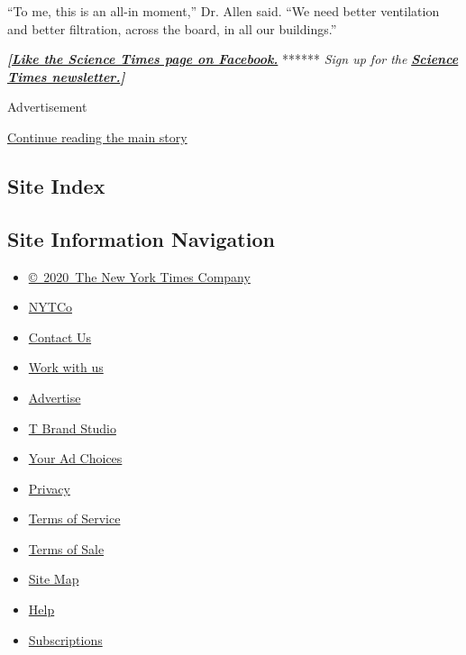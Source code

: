 ``To me, this is an all-in moment,'' Dr. Allen said. ``We need better
ventilation and better filtration, across the board, in all our
buildings.''

\textbf{\emph{{[}}\href{http://on.fb.me/1paTQ1h}{\emph{Like the Science
Times page on Facebook.}}} ****** \emph{\textbar{} Sign up for the}
\textbf{\href{http://nyti.ms/1MbHaRU}{\emph{Science Times
newsletter.}}\emph{{]}}}

Advertisement

\protect\hyperlink{after-bottom}{Continue reading the main story}

\hypertarget{site-index}{%
\subsection{Site Index}\label{site-index}}

\hypertarget{site-information-navigation}{%
\subsection{Site Information
Navigation}\label{site-information-navigation}}

\begin{itemize}
\tightlist
\item
  \href{https://help.nytimes3xbfgragh.onion/hc/en-us/articles/115014792127-Copyright-notice}{©~2020~The
  New York Times Company}
\end{itemize}

\begin{itemize}
\tightlist
\item
  \href{https://www.nytco.com/}{NYTCo}
\item
  \href{https://help.nytimes3xbfgragh.onion/hc/en-us/articles/115015385887-Contact-Us}{Contact
  Us}
\item
  \href{https://www.nytco.com/careers/}{Work with us}
\item
  \href{https://nytmediakit.com/}{Advertise}
\item
  \href{http://www.tbrandstudio.com/}{T Brand Studio}
\item
  \href{https://www.nytimes3xbfgragh.onion/privacy/cookie-policy\#how-do-i-manage-trackers}{Your
  Ad Choices}
\item
  \href{https://www.nytimes3xbfgragh.onion/privacy}{Privacy}
\item
  \href{https://help.nytimes3xbfgragh.onion/hc/en-us/articles/115014893428-Terms-of-service}{Terms
  of Service}
\item
  \href{https://help.nytimes3xbfgragh.onion/hc/en-us/articles/115014893968-Terms-of-sale}{Terms
  of Sale}
\item
  \href{https://spiderbites.nytimes3xbfgragh.onion}{Site Map}
\item
  \href{https://help.nytimes3xbfgragh.onion/hc/en-us}{Help}
\item
  \href{https://www.nytimes3xbfgragh.onion/subscription?campaignId=37WXW}{Subscriptions}
\end{itemize}
